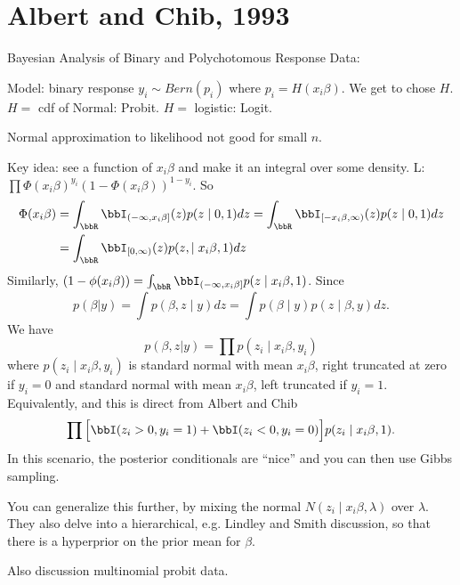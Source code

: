 \documentclass{article}
\begin{document}
%



\tableofcontents

\section{Albert and Chib, 1993}

Bayesian Analysis of Binary and Polychotomous Response Data:

\begin{outline}
\1 Model: binary response $y_i \sim Bern(p_i)$ where $p_i = H(x_i \beta)$.
\2 We get to chose $H$.  $H =$ cdf of Normal: Probit.  $H=$ logistic: Logit.

\1 Normal approximation to likelihood not good for small $n$.

\1 Key idea: see a function of $x_i \beta$ and make it an integral over some
density.
\2 L: $\prod \Phi(x_i \beta)^{y_i} (1 - \Phi(x_i \beta))^{1-y_i}$.  So
\begin{align*}
\Phi(x_i \beta) 
& = \int_\bbR \bbI_{(-\infty, x_i \beta]}(z) p(z \mid 0, 1) dz 
= \int_\bbR \bbI_{[-x_i \beta, \infty)}(z) p(z \mid 0, 1) dz \\
& = \int_\bbR \bbI_{[0, \infty)}(z) p(z, \mid x_i \beta, 1) dz
\end{align*}
Similarly, $(1-\phi(x_i \beta)) = \int_\bbR \bbI_{(-\infty,x_i \beta]} p(z \mid
x_i \beta, 1)$.
Since
\[
p(\beta | y) = \int p(\beta, z \mid y) dz = \int p(\beta \mid y) p(z \mid \beta,y) dz.
\]
We have
\[
p(\beta, z | y) = \prod p(z_i \mid x_i \beta, y_i)
\]
where $p(z_i \mid x_i \beta, y_i)$ is standard normal with mean $x_i \beta$,
right truncated at zero if $y_i = 0$ and standard normal with mean $x_i \beta$,
left truncated if $y_i=1$.  Equivalently, and this is direct from Albert and
Chib
\[
\prod \Big[ \bbI(z_i > 0, y_i=1) + \bbI(z_i < 0, y_i=0) \Big] p(z_i \mid x_i
\beta, 1).
\]
In this scenario, the posterior conditionals are ``nice'' and you can then use
Gibbs sampling.

\2 You can generalize this further, by mixing the normal $N(z_i \mid x_i \beta,
\lambda)$ over $\lambda$.  They also delve into a hierarchical, e.g. Lindley and
Smith discussion, so that there is a hyperprior on the prior mean for $\beta$.

\1 Also discussion multinomial probit data.

\end{outline}
\end{document}
